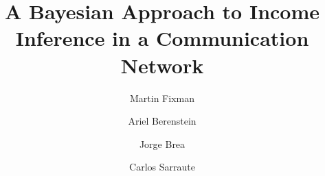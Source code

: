 



\title{A Bayesian Approach to Income Inference in a Communication Network}

\author{%
Martin Fixman \and
Ariel Berenstein \and
Jorge Brea \and
Carlos Sarraute
}

\maketitle

\begin{abstract}
	
\end{abstract}














{}


